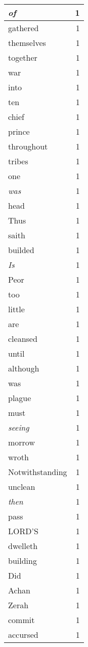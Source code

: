 \begin{center}
\begin{longtable}{l|r}
\emph{of} & 1\\ \hline 
gathered & 1\\ \hline 
themselves & 1\\ \hline 
together & 1\\ \hline 
war & 1\\ \hline 
into & 1\\ \hline 
ten & 1\\ \hline 
chief & 1\\ \hline 
prince & 1\\ \hline 
throughout & 1\\ \hline 
tribes & 1\\ \hline 
one & 1\\ \hline 
\emph{was} & 1\\ \hline 
head & 1\\ \hline 
Thus & 1\\ \hline 
saith & 1\\ \hline 
builded & 1\\ \hline 
\emph{Is} & 1\\ \hline 
Peor & 1\\ \hline 
too & 1\\ \hline 
little & 1\\ \hline 
are & 1\\ \hline 
cleansed & 1\\ \hline 
until & 1\\ \hline 
although & 1\\ \hline 
was & 1\\ \hline 
plague & 1\\ \hline 
must & 1\\ \hline 
\emph{seeing} & 1\\ \hline 
morrow & 1\\ \hline 
wroth & 1\\ \hline 
Notwithstanding & 1\\ \hline 
unclean & 1\\ \hline 
\emph{then} & 1\\ \hline 
pass & 1\\ \hline 
LORD'S & 1\\ \hline 
dwelleth & 1\\ \hline 
building & 1\\ \hline 
Did & 1\\ \hline 
Achan & 1\\ \hline 
Zerah & 1\\ \hline 
commit & 1\\ \hline 
accursed & 1\\ \hline 

\end{longtable}
\end{center}
